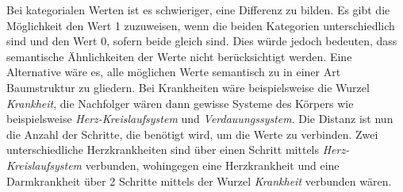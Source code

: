 Bei kategorialen Werten ist es schwieriger, eine Differenz zu bilden.
Es gibt die Möglichkeit den Wert 1 zuzuweisen, wenn die beiden Kategorien unterschiedlich sind und den Wert 0, sofern beide gleich sind. 
Dies würde jedoch bedeuten, dass semantische Ähnlichkeiten der Werte nicht berücksichtigt werden.
Eine Alternative wäre es, alle möglichen Werte semantisch zu in einer Art Baumstruktur zu gliedern. 
Bei Krankheiten wäre beispielsweise die Wurzel \textit{\dq Krankheit\dq}, die Nachfolger wären dann gewisse Systeme des Körpers wie beispielsweise \textit{\dq Herz-Kreislaufsystem\dq} und \textit{\dq Verdauungssystem\dq}.
Die Distanz ist nun die Anzahl der Schritte, die benötigt wird, um die Werte zu verbinden. 
Zwei unterschiedliche Herzkrankheiten sind über einen Schritt mittels \textit{\dq Herz-Kreislaufsystem\dq} verbunden, wohingegen eine Herzkrankheit und eine Darmkrankheit über 2 Schritte mittels der Wurzel \textit{\dq Krankheit\dq} verbunden wären.

